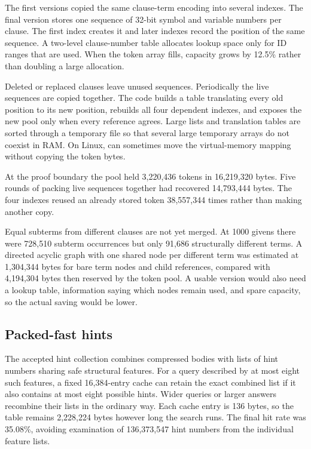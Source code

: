 \documentclass[11pt]{article}
\newcommand{\setting}[1]{\texttt{\detokenize{#1}}}
\begin{document}
The first versions copied the same clause-term encoding into several indexes.
The final version stores one sequence of 32-bit symbol and variable numbers per
clause.  The first index creates it and later indexes record the position of the
same sequence.  A two-level clause-number table allocates lookup space only for
ID ranges that are used.  When the token array fills, capacity grows by 12.5\%
rather than doubling a large allocation.

Deleted or replaced clauses leave unused sequences.  Periodically the live
sequences are copied together.  The code builds a table translating every old
position to its new position, rebuilds all four dependent indexes, and exposes
the new pool only when every reference agrees.  Large lists and translation
tables are sorted through a temporary file so that several large temporary arrays
do not coexist in RAM.  On Linux, \setting{mremap} can sometimes move the
virtual-memory mapping without copying the token bytes.

At the proof boundary the pool held 3,220,436 tokens in 16,219,320 bytes.  Five
rounds of packing live sequences together had recovered 14,793,444 bytes.  The
four indexes reused an already stored token 38,557,344 times rather than making
another copy.

Equal subterms from different clauses are not yet merged.  At 1000 givens there
were 728,510 subterm occurrences but only 91,686 structurally different terms.
A directed acyclic graph with one shared node per different term was
estimated at 1,304,344 bytes for bare term nodes and child references, compared
with 4,194,304 bytes then
reserved by the token pool.  A usable version would also need a lookup table,
information saying which nodes remain used, and spare capacity, so the actual
saving would be lower.

\subsection{Packed-fast hints}

The accepted hint collection combines compressed bodies with lists of hint numbers
sharing safe structural features.  For a query described by at most eight such
features, a fixed 16,384-entry cache can retain the exact combined list if it
also contains at most eight possible hints.  Wider queries or larger answers
recombine their lists in the ordinary way.  Each cache
entry is 136 bytes, so the table remains 2,228,224 bytes however long the search
runs.  The final hit rate was 35.08\%, avoiding examination of 136,373,547 hint
numbers from the individual feature lists.
\end{document}
